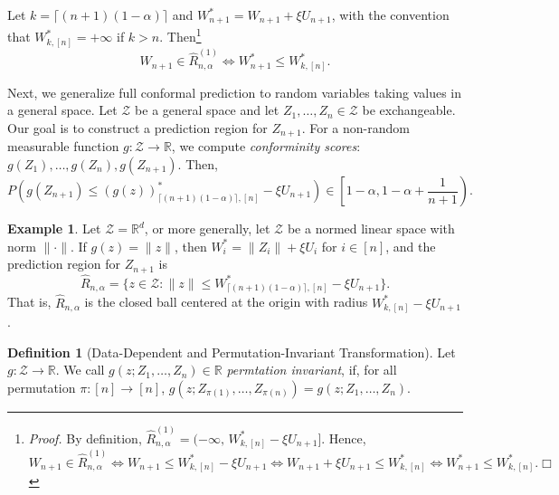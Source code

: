 \documentclass[a4paper,12pt]{article}
\numberwithin{equation}{section}
\theoremstyle{plain}
\theoremstyle{definition}
\newtheorem{definition}[theorem]{Definition}
\newtheorem{example}[theorem]{Example}
\theoremstyle{remark}
\begin{document}
Let $k=\lceil(n+1)(1-\alpha)\rceil$ and $W_{n+1}^*=W_{n+1}+\xi U_{n+1}$,
with the convention that $W^*_{k,[n]}=+\infty$ if $k>n$. Then\footnote{\emph{Proof.} By definition, $\hat{R}_{n,\alpha}^{(1)}=(-\infty,\,W^*_{k,[n]}-\xi U_{n+1}]$. Hence,
  \begin{equation*}
    W_{n+1}\in\hat{R}_{n,\alpha}^{(1)}
    \iff W_{n+1}\le W^*_{k,[n]}-\xi U_{n+1}
    \iff W_{n+1}+\xi U_{n+1}\le W^*_{k,[n]}
    \iff W_{n+1}^*\le W^*_{k,[n]}. \Box
  \end{equation*}}
\begin{equation*}
  W_{n+1}\in\hat{R}_{n,\alpha}^{(1)} \iff W_{n+1}^*\le W^*_{k,[n]}.
\end{equation*}

Next, we generalize full conformal prediction to random variables taking values in a general space. Let $\mathcal{Z}$ be a general space and let $Z_1,\dots,Z_n\in\mathcal{Z}$ be exchangeable. Our goal is to construct a prediction region for $Z_{n+1}$. For a non-random measurable function $g:\mathcal{Z}\to\mathbb{R}$, we compute \emph{conforminity scores}: $g(Z_1),\dots,g(Z_n),g(Z_{n+1})$. Then,
\begin{equation}
    P\left(g(Z_{n+1})\leq (g(z))_{\lceil(n+1)(1-\alpha)\rceil,[n]}^*-\xi U_{n+1}\right)\in\left[1-\alpha,1-\alpha+\frac{1}{n+1}\right). 
\end{equation}

\begin{example}
    Let $\mathcal{Z}=\mathbb{R}^d$, or more generally, let $\mathcal{Z}$ be a normed linear space
    with norm $\lVert\cdot\rVert$. If $g(z)=\lVert z\rVert$, then $W_i^*=\lVert Z_i\rVert+\xi U_i$
    for $i\in[n]$, and the prediction region for $Z_{n+1}$ is
    \begin{equation*}
        \hat{R}_{n,\alpha}=\bigl\{z\in\mathcal{Z}:\lVert z\rVert\le W^*_{\lceil(n+1)(1-\alpha)\rceil,[n]}-\xi U_{n+1}\bigr\}.
    \end{equation*}
    That is, $\hat{R}_{n,\alpha}$ is the closed ball centered at the origin with radius $W^*_{k,[n]}-\xi U_{n+1}$.
\end{example}

\begin{definition}[Data-Dependent and Permutation-Invariant Transformation]
    Let $g:\mathcal{Z}\to\mathbb{R}$. We call $g(z;Z_1,\dots,Z_n)\in\mathbb{R}$ \emph{permtation invariant}, if, for all permutation $\pi:[n]\to [n]$, $g(z;Z_{\pi(1)},\dots,Z_{\pi(n)})=g(z;Z_1,\dots,Z_{n})$. 
\end{definition}
\end{document}
